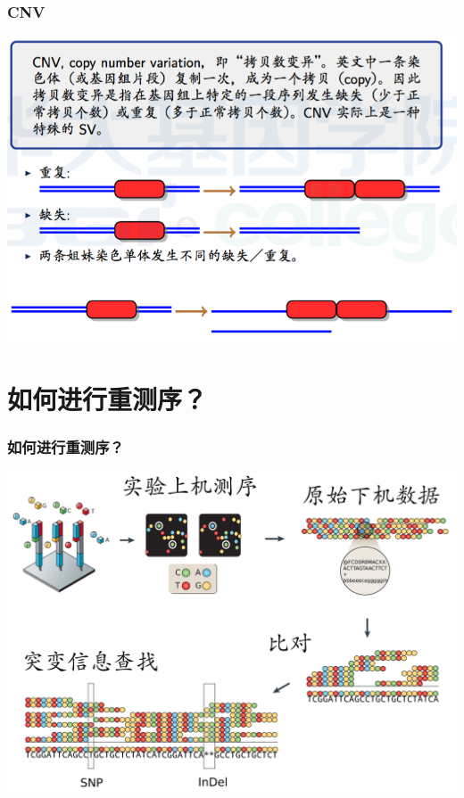 \documentclass[12pt]{beamer}
\begin{document}
\begin{frame}\frametitle{CNV}
  \includegraphics[width=\textwidth]{figures/old_slides/cnv.png}
\end{frame}

\section{如何进行重测序？}
\begin{frame}\frametitle{如何进行重测序？}
  \includegraphics[width=\textwidth]{figures/reseq-pip.png}
\end{frame}
\end{document}
